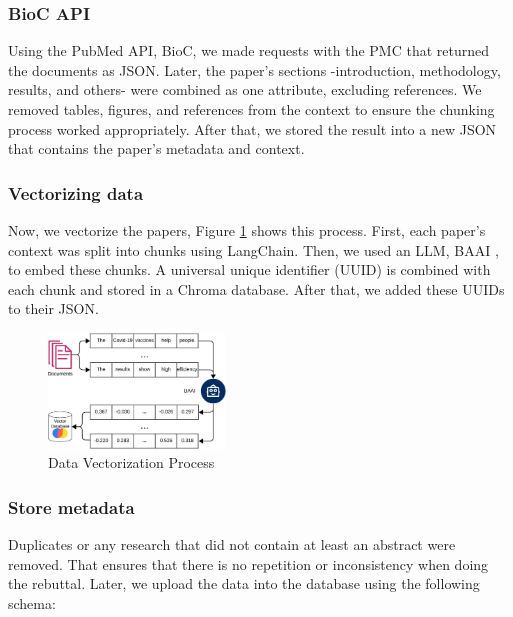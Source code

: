 \subsubsection{BioC API}
Using the PubMed API, BioC, we made requests with the PMC that returned the documents as JSON. Later, the paper's sections -introduction, methodology, results, and others- were combined as one attribute, excluding references. We removed tables, figures, and references from the context to ensure the chunking process worked appropriately. After that, we stored the result into a new JSON that contains the paper's metadata and context. 

\subsubsection{Vectorizing data}
Now, we vectorize the papers, Figure \ref{fig:vector} shows this process. First, each paper’s context was split into chunks using LangChain. Then, we used an LLM, BAAI \cite{bge_embedding}, to embed these chunks. A universal unique identifier (UUID) is combined with each chunk and stored in a Chroma database. After that, we added these UUIDs to their JSON. 

\begin{figure}[htbp]
	\begin{center}
		\includegraphics[width=0.42\textwidth]{figures/Data_vectorization.jpeg} %
	\end{center}
	\caption{Data Vectorization Process} %
	\label{fig:vector}
\end{figure}


\subsubsection{Store metadata}
Duplicates or any research that did not contain at least an abstract were removed. That ensures that there is no repetition or inconsistency when doing the rebuttal. Later, we upload the data into the database using the following schema:

